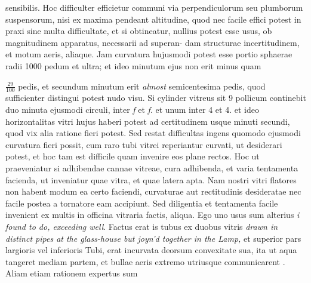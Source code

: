 sensibilis. Hoc difficulter efficietur communi via perpendiculorum seu plumborum suspensorum, nisi ex maxima pendeant altitudine, quod nec facile effici potest in praxi sine multa difficultate, et si obtineatur, nullius potest esse usus, ob magnitudinem apparatus, necessarii ad superan-
\pend
\newpage
\pstart\noindent dam structurae incertitudinem, et motum aeris, aliaque. Jam curvatura hujusmodi potest esse portio sphaerae radii 1000 pedum et ultra; et ideo minutum ejus non erit minus quam \rule[-5mm]{0pt}{12mm}$\displaystyle \frac{29}{100}$ pedis, et secundum minutum erit \textit{almost} semicentesima pedis, quod sufficienter distingui potest nudo visu. Si cylinder vitreus sit 9 pollicum continebit duo minuta ejusmodi circuli, inter \textit{f} et \textit{f}. et unum inter 4 et 4. et ideo horizontalitas vitri hujus haberi potest ad certitudinem usque minuti secundi, quod vix alia ratione fieri potest. Sed restat difficultas ingens quomodo ejusmodi curvatura fieri possit, cum raro tubi vitrei reperiantur curvati, ut desiderari potest, et hoc tam est difficile quam invenire eos plane rectos. Hoc ut praeveniatur si adhibendae cannae vitreae, cura adhibenda, et varia tentamenta facienda, ut inveniatur quae vitra, et quae latera apta. Nam nostri vitri flatores non habent modum ea certo faciendi, curvaturae aut rectitudinis desideratae nec facile postea a tornatore eam accipiunt. Sed diligentia et tentamenta facile invenient ex multis in officina vitraria factis, aliqua. Ego uno usus sum alterius  \textit{i found to do, exceeding well}. Factus erat is tubus ex duobus vitris \textit{drawn in distinct pipes at the glass-house but joyn'd together in the Lamp,} et superior pars largioris vel inferioris Tubi, erat incurvata deorsum convexitate sua, ita ut aqua tangeret mediam partem, et bullae aeris extremo utriusque communicarent . Aliam etiam rationem expertus sum
